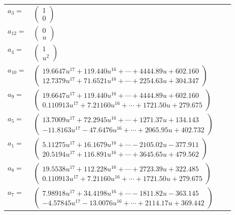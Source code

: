 \documentclass[1p]{elsarticle_modified}
\theoremstyle{definition}
\begin{document}
\begin{tabular}{m{7pt} m{180pt} m{7pt} m{180pt} }
\flushright $a_{3}=$&$\begin{pmatrix}1\\0\end{pmatrix}$ \\
\flushright $a_{12}=$&$\begin{pmatrix}0\\u\end{pmatrix}$ \\
\flushright $a_{4}=$&$\begin{pmatrix}1\\u^2\end{pmatrix}$ \\
\flushright $a_{10}=$&$\begin{pmatrix}19.6647 u^{17}+119.440 u^{16}+\cdots+4444.89 u+602.160\\12.7379 u^{17}+71.6521 u^{16}+\cdots+2254.63 u+304.347\end{pmatrix}$ \\
\flushright $a_{9}=$&$\begin{pmatrix}19.6647 u^{17}+119.440 u^{16}+\cdots+4444.89 u+602.160\\0.110913 u^{17}+7.21160 u^{16}+\cdots+1721.50 u+279.675\end{pmatrix}$ \\
\flushright $a_{5}=$&$\begin{pmatrix}13.7009 u^{17}+72.2945 u^{16}+\cdots+1271.37 u+134.143\\-11.8163 u^{17}-47.6476 u^{16}+\cdots+2065.95 u+402.732\end{pmatrix}$ \\
\flushright $a_{1}=$&$\begin{pmatrix}5.11275 u^{17}+16.1679 u^{16}+\cdots-2105.02 u-377.911\\20.5194 u^{17}+116.891 u^{16}+\cdots+3645.65 u+479.562\end{pmatrix}$ \\
\flushright $a_{8}=$&$\begin{pmatrix}19.5538 u^{17}+112.228 u^{16}+\cdots+2723.39 u+322.485\\0.110913 u^{17}+7.21160 u^{16}+\cdots+1721.50 u+279.675\end{pmatrix}$ \\
\flushright $a_{7}=$&$\begin{pmatrix}7.98918 u^{17}+34.4198 u^{16}+\cdots-1811.82 u-363.145\\-4.57845 u^{17}-13.0076 u^{16}+\cdots+2114.17 u+369.442\end{pmatrix}$ \\

\end{tabular}
\end{document}
